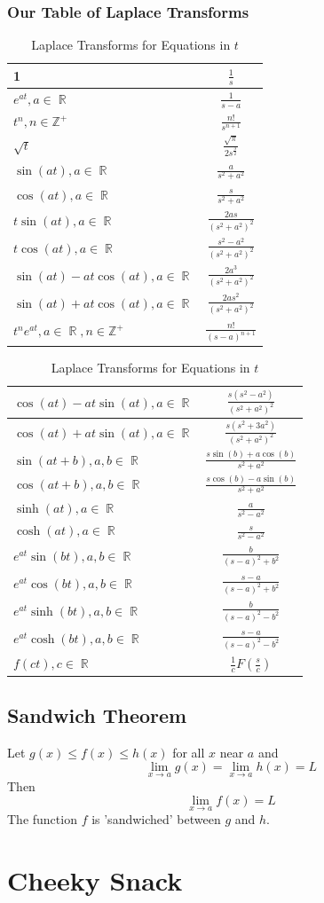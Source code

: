 \documentclass[a4paper,twoside,10pt]{article}
\DeclareMathOperator\R{\mathbb{R}}
\begin{document}
		\subsubsection{Our Table of Laplace Transforms}
			\bgroup
			\everymath{\displaystyle}
			\def\arraystretch{2.5}
			\begin{table}[H]
				\footnotesize
				\begin{tabular}[t]{|p{5cm}|c|}
					\hline
					1&$\frac{1}{s}$\\\hline
					$e^{at},a\in\R$&$\frac{1}{s-a}$\\\hline
					$t^n,n\in\mathbb{Z}^+$&$\frac{n!}{s^{n+1}}$\\\hline
					$\sqrt{t}$&$\frac{\sqrt{\pi}}{2s^{\frac{3}{2}}}$\\\hline
					$\sin(at),a\in\R$&$\frac{a}{s^2+a^2}$\\\hline
					$\cos(at),a\in\R$&$\frac{s}{s^2+a^2}$\\\hline
					$t\sin(at),a\in\R$&$\frac{2as}{(s^2+a^2)^2}$\\\hline
					$t\cos(at),a\in\R$&$\frac{s^2-a^2}{(s^2+a^2)^2}$\\\hline
					$\sin(at)-at\cos(at),a\in\R$&$\frac{2a^3}{(s^2+a^2)^2}$\\\hline
					$\sin(at)+at\cos(at),a\in\R$&$\frac{2as^2}{(s^2+a^2)^2}$\\\hline
					$t^ne^{at},a\in\R,n\in\mathbb{Z}^+$&$\frac{n!}{(s-a)^{n+1}}$\\\hline
				\end{tabular}
				\hfill
				\begin{tabular}[t]{|p{5cm}|c|}
					\hline
					$\cos(at)-at\sin(at),a\in\R$&$\frac{s(s^2-a^2)}{(s^2+a^2)^2}$\\\hline
					$\cos(at)+at\sin(at),a\in\R$&$\frac{s(s^2+3a^2)}{(s^2+a^2)^2}$ \\\hline
					$\sin(at+b),a,b\in\R$&$\frac{s\sin(b)+a\cos(b)}{s^2+a^2}$\\\hline
					$\cos(at+b),a,b\in\R$&$\frac{s\cos(b)-a\sin(b)}{s^2+a^2}$ \\\hline   
					$\sinh(at),a\in\R$&$\frac{a}{s^2-a^2}$\\\hline
					$\cosh(at),a\in\R$&$\frac{s}{s^2-a^2}$\\\hline
					$e^{at}\sin(bt),a,b\in\R$&$\frac{b}{(s-a)^2+b^2}$\\\hline
					$e^{at}\cos(bt),a,b\in\R$&$\frac{s-a}{(s-a)^2+b^2}$\\\hline
					$e^{at}\sinh(bt),a,b\in\R$&$\frac{b}{(s-a)^2-b^2}$\\\hline
					$e^{at}\cosh(bt),a,b\in\R$&$\frac{s-a}{(s-a)^2-b^2}$\\\hline
					$f(ct),c\in\R$&$\frac{1}{c}F(\frac{s}{c})$\\\hline
				\end{tabular}
				\caption{Laplace Transforms for Equations in $t$}
			\end{table}
			\everymath{}
			\egroup
		\subsection{Sandwich Theorem}
			Let $g(x)\leq f(x)\leq h(x)$ for all $x$ near $a$ and
			\[
				\lim_{x\to a}g(x)=\lim_{x\to a}h(x)=L
			\]
			Then
			\[
				\lim_{x\to a}f(x)=L
			\]
			The function $f$ is 'sandwiched' between $g$ and $h$.
	\newpage
	\section{Cheeky Snack}
\end{document}
